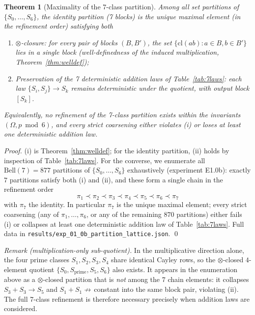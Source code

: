 \documentclass[10pt,twocolumn]{article}
\newtheorem{theorem}{Theorem}[section]
\newcommand{\cl}{\mathrm{cl}}
\newcommand{\Om}{\Omega}
\begin{document}
\begin{theorem}[Maximality of the 7-class partition]
\label{thm:maximality}
Among all set partitions of $\{S_0,\dots,S_6\}$, the identity
partition (7 blocks) is the unique \emph{maximal} element
(in the refinement order) satisfying both
\begin{enumerate}[noitemsep, topsep=2pt]
\item[(i)] \emph{$\otimes$-closure:} for every pair of blocks
      $(B, B')$, the set $\{\cl(a b) : a \in B, b \in B'\}$ lies in a
      single block (well-definedness of the induced multiplication,
      Theorem~\ref{thm:welldef});
\item[(ii)] \emph{Preservation of the 7 deterministic addition laws}
      of Table~\ref{tab:7laws}: each law $\{S_i, S_j\} \to S_k$
      remains deterministic under the quotient, with output block
      $[S_k]$.
\end{enumerate}
Equivalently, no refinement of the 7-class partition exists within the
invariants $(\Om, p \bmod 6)$, and every strict coarsening either
violates (i) or loses at least one deterministic addition law.
\end{theorem}

\begin{proof}
(i) is Theorem~\ref{thm:welldef}; for the identity partition, (ii)
holds by inspection of Table~\ref{tab:7laws}.
For the converse, we enumerate all $\mathrm{Bell}(7)=877$ partitions of
$\{S_0,\dots,S_6\}$ exhaustively (experiment E1.0b): exactly
$7$ partitions satisfy both (i) and (ii), and these form a single
chain in the refinement order
\[
\pi_1 \prec \pi_2 \prec \pi_3 \prec \pi_4 \prec \pi_5 \prec \pi_6 \prec
\pi_7
\]
with $\pi_7$ the identity. In particular $\pi_7$ is the unique maximal
element; every strict coarsening (any of $\pi_1,\dots,\pi_6$, or any
of the remaining $870$ partitions) either fails (i) or collapses at
least one deterministic addition law of Table~\ref{tab:7laws}.
Full data in \texttt{results/exp\_01\_0b\_partition\_lattice.json}. \qed
\end{proof}

\emph{Remark (multiplication-only sub-quotient).}
In the multiplicative direction alone, the four prime classes
$S_1,S_2,S_3,S_4$ share identical Cayley rows, so the $\otimes$-closed
$4$-element quotient $\{S_0, S_\mathrm{prime}, S_5, S_6\}$ also
exists. It appears in the enumeration above as a $\otimes$-closed
partition that is \emph{not} among the $7$ chain elements: it collapses
$S_3{+}S_3 \to S_5$ and $S_1{+}S_1 \not\to$\,constant into the same
block pair, violating (ii). The full 7-class refinement is therefore
necessary precisely when addition laws are considered.
\end{document}
